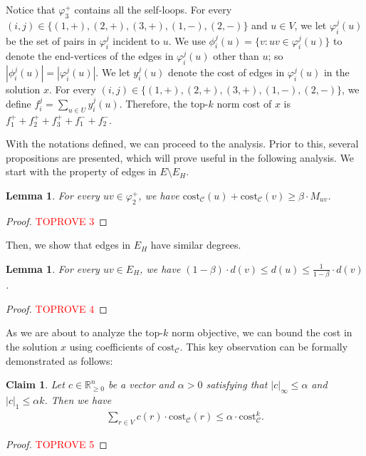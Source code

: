 \documentclass[11pt]{article}
\newcommand{\R}{\mathbb{R}}
\newcommand{\cost}{\mathrm{cost}}
\newtheorem{lemma}[theorem]{Lemma}
\newtheorem{claim}[theorem]{Claim}
\newcommand{\calC}{{\mathcal{C}}}
\begin{document}
\begin{CJK*}{UTF8}{gbsn}
 Notice that $\varphi^+_3$ contains all the self-loops. For every $(i,j) \in \{(1,+),(2,+),(3,+),(1,-),(2,-)\}$ and $u \in V$, we let $\varphi^j_i(u)$ be the set of pairs in $\varphi^j_i$ incident to $u$. We use $\phi^j_i(u) = \{v: uv \in \varphi^j_i(u)\}$ to denote the end-vertices of the edges in $\varphi^j_i(u)$ other than $u$; so $|\phi^j_i(u)| = |\varphi^j_i(u)|$.  We let $y^j_i(u)$ denote the cost of edges in $\varphi^j_i(u)$ in the solution $x$.  For every $(i,j) \in \{(1,+),(2,+),(3,+),(1,-),(2,-)\}$,  we define $f^j_i = \sum_{u \in U}y^j_i(u)$. Therefore, the top-$k$ norm cost of $x$ is $f^+_1 + f^+_2 + f^+_3 + f^-_1 + f^-_2$. 
\medskip

With the notations defined, we can proceed to the analysis. Prior to this, several propositions are presented, which will prove useful in the following analysis. We start with the property of edges in $E \setminus E_H$.

\begin{lemma}
    \label{lemma:varphi1}
    For every $uv \in \varphi^+_2$, we have $\cost_\calC(u) + \cost_\calC(v) \geq \beta \cdot M_{uv}$.
\end{lemma}
\begin{proof}\textcolor{red}{TOPROVE 3}\end{proof}

Then, we show that edges in $E_H$ have similar degrees.

\begin{lemma}
    \label{lemma:Hdegreebound}
    For every $uv \in E_H$, we have $(1-\beta)\cdot d(v) \le d(u) \le \frac{1}{1-\beta}\cdot d(v)$.
\end{lemma}
\begin{proof}\textcolor{red}{TOPROVE 4}\end{proof}

As we are about to analyze the top-$k$ norm objective, we can bound the cost in the solution $x$ using coefficients of $\cost_\calC$. This key observation can be formally demonstrated as follows:

\begin{claim}
    \label{claim:using-coefficients}
    Let $c \in \R_{\geq 0}^{n}$ be a vector and $\alpha > 0$ satisfying that $|c|_\infty \leq \alpha$ and $|c|_1 \leq \alpha k$.  Then we have 
    \begin{align*}
        \sum_{r \in V}c(r) \cdot \cost_\calC(r) \leq \alpha \cdot \cost^k_\calC.
    \end{align*}
\end{claim}
\begin{proof}\textcolor{red}{TOPROVE 5}\end{proof}


\end{CJK*}
\end{document}
